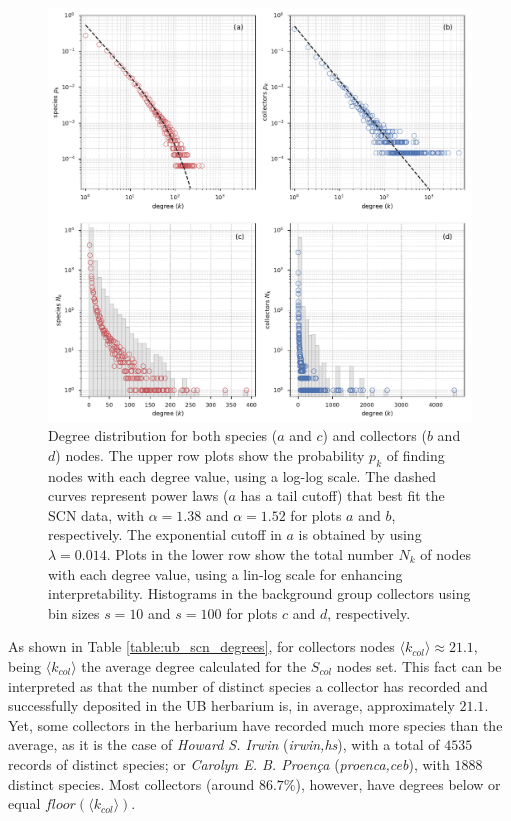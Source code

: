   \begin{figure}[!h]
  	\centering
    \includegraphics[width=\linewidth]{figures/casestudy_ub/scn_degree_dist}
    \caption{Degree distribution for both species ($a$ and $c$) and collectors ($b$ and $d$) nodes. The upper row plots show the probability $p_k$ of finding nodes with each degree value, using a log-log scale. The dashed curves represent power laws ($a$ has a tail cutoff) that best fit the SCN data, with $\alpha=1.38$ and $\alpha=1.52$ for plots $a$ and $b$, respectively. The exponential cutoff in $a$ is obtained by using $\lambda=0.014$. Plots in the lower row show the total number $N_k$ of nodes with each degree value, using a lin-log scale for enhancing interpretability. Histograms in the background group collectors using bin sizes $s=10$ and $s=100$ for plots $c$ and $d$, respectively.}
    \label{fig:ub_scn_degree_dist}
  \end{figure}
  

As shown in Table \ref{table:ub_scn_degrees}, for collectors nodes $\langle k_{col}\rangle \approx 21.1$, being $\langle k_{col}\rangle$ the average degree calculated for the $S_{col}$ nodes set. This fact can be interpreted as that the number of distinct species a collector has recorded and successfully deposited in the UB herbarium is, in average, approximately $21.1$. 
Yet, some collectors in the herbarium have recorded much more species than the average, as it is the case of \textit{Howard S. Irwin} (\textit{irwin,hs}), with a total of $4535$ records of distinct species; or \textit{Carolyn E. B. Proença} (\textit{proenca,ceb}), with $1888$ distinct species. 
Most collectors (around $86.7\%$), however, have degrees below or equal $floor(\langle k_{col} \rangle)$.

